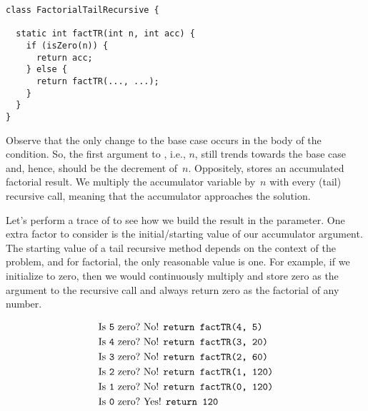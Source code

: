 \begin{lstlisting}[language=MyJava]
class FactorialTailRecursive {

  static int factTR(int n, int acc) {
    if (isZero(n)) {
      return acc;
    } else {
      return factTR(..., ...);
    }
  }
}
\end{lstlisting}

Observe that the only change to the base case occurs in the body of the condition. 
So, the first argument to , i.e., $n$, still trends towards the base case and, hence, should be the decrement of~$n$. 
Oppositely,  stores an accumulated factorial result. 
We multiply the accumulator variable by~$n$ with every (tail) recursive call, meaning that the accumulator approaches the solution.

Let's perform a trace of  to see how we build the result in the  parameter. 
One extra factor to consider is the initial/starting value of our accumulator argument. 
The starting value of a tail recursive method depends on the context of the problem, and for factorial, the only reasonable value is one. 
For example, if we initialize  to zero, then we would continuously multiply and store zero as the argument to the recursive call and always return zero as the factorial of any number.

\begin{align*}
    \text{Is }\texttt{5} \text{ zero?} &\text{ No! }\texttt{return factTR(4, 5)}\\
    \text{Is }\texttt{4} \text{ zero?} &\text{ No! }\texttt{return factTR(3, 20)}\\
    \text{Is }\texttt{3} \text{ zero?} &\text{ No! }\texttt{return factTR(2, 60)}\\
    \text{Is }\texttt{2} \text{ zero?} &\text{ No! }\texttt{return factTR(1, 120)}\\
    \text{Is }\texttt{1} \text{ zero?} &\text{ No! }\texttt{return factTR(0, 120)}\\
    \text{Is }\texttt{0} \text{ zero?} &\text{ Yes! }\texttt{return 120}
\end{align*}

